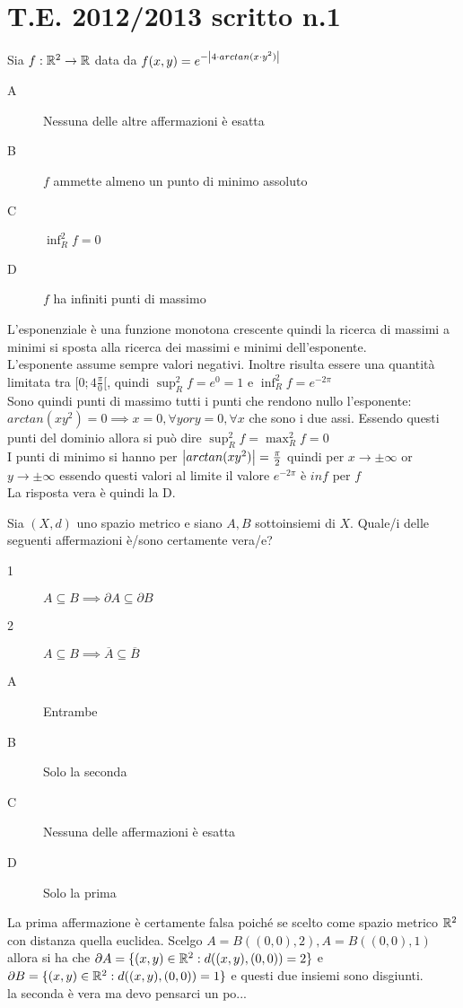 \section{T.E. 2012/2013 scritto n.1}
\begin{exercise}
	Sia $f: \mathbb{R}^2 \to \mathbb{R}$ data da $f(x, y)=e^{-\left|4\cdot arctan(x\cdot y^2)\right|}$
	\begin{description}
		\item[A] Nessuna delle altre affermazioni è esatta
		\item[B] $f$ ammette almeno un punto di minimo assoluto
		\item[C] $\inf_R^2f = 0$
		\item[D] $f$ ha infiniti punti di massimo
	\end{description}
	L'esponenziale è una funzione monotona crescente quindi la ricerca di massimi a minimi si sposta alla ricerca dei massimi e minimi dell'esponente.\\
	L'esponente assume sempre valori negativi. Inoltre risulta essere una quantità limitata tra $[0;4\frac{\pi}{0}[$, quindi $\sup_R^2f=e^0=1$ e $\inf_R^2f=e^{-2\pi}$\\
	Sono quindi punti di massimo tutti i punti che rendono nullo l'esponente: $arctan(xy^2)=0 \implies x=0,\forall y or y=0,\forall x$ che sono i due assi. Essendo questi punti del dominio allora si può dire $\sup_R^2f=\max_R^2f=0$\\
	I punti di minimo si hanno per $\left|arctan(xy^2)\right|=\frac{\pi}{2}$ quindi per $x \to \pm\infty$ or $y \to \pm\infty$ essendo questi valori al limite il valore $e^{-2\pi}$ è $inf$ per $f$\\
	La risposta vera è quindi la D.\\
\end{exercise}
\begin{exercise}
	Sia $(X,d)$ uno spazio metrico e siano $A, B$ sottoinsiemi di $X$. Quale/i delle seguenti affermazioni è/sono certamente vera/e?
	\begin{description}
		\item[1] $A\subseteq B \implies\partial A\subseteq \partial B$
		\item[2] $A\subseteq B \implies\overline{A}\subseteq\overline{B}$
	\end{description}
	\begin{description}
		\item[A] Entrambe
		\item[B] Solo la seconda
		\item[C] Nessuna delle affermazioni è esatta
		\item[D] Solo la prima
	\end{description}
	La prima affermazione è certamente falsa poiché se scelto come spazio metrico $\mathbb{R}^2$ con distanza quella euclidea. Scelgo $A=B((0,0),2), A=B((0,0),1)$ allora si ha che $\partial A = \{(x,y)\in \mathbb{R}^2:d((x,y),(0,0))=2\}$ e $\partial B = \{(x,y)\in \mathbb{R}^2:d((x,y),(0,0))=1\}$ e questi due insiemi sono disgiunti.\\
	la seconda è vera ma devo pensarci un po...\\
\end{exercise}


\endgroup %
